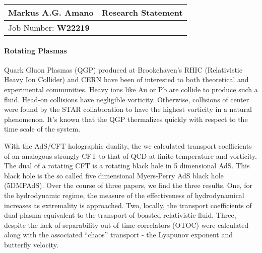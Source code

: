 \documentclass[12pt]{article}
\begin{document}
\begin{center}
  \begin{tabularx}{\textwidth} { 
      >{\raggedright\arraybackslash}X 
    >{\raggedleft\arraybackslash}X  }
    \huge Markus A.G. Amano & Research Statement\\
    \hline
    Job Number: \textbf{W22219} & \\
  \end{tabularx}
\end{center}


\paragraph{Rotating Plasmas}

Quark Gluon Plasmas (QGP) produced at Brookehaven's RHIC (Relativistic Heavy Ion Collider) and CERN have been of interested to both theoretical and experimental communities.
Heavy ions like Au or Pb are collide to produce such a fluid.
Head-on collisions have negligible vorticity.
Otherwise, collisions of center were found by the STAR collaboration to have the highest vorticity in a natural phenomenon.
It's known that the QGP thermalizes quickly with respect to the time scale of the system.

With the AdS/CFT holographic duality, the we calculated transport coefficients of an analogous strongly CFT to that of QCD at finite temperature and vorticity.
The dual of a rotating CFT is a rotating black hole in 5 dimensional AdS. 
This black hole is the so called five dimensional Myers-Perry AdS black hole (5DMPAdS).
Over the course of three papers, we find the three results. 
One, for the hydrodynamic regime, the measure of the effectiveness of hydrodynamical increases as extremality is approached.
Two, locally, the transport coefficients of dual plasma equivalent to the transport of boasted relativistic fluid.
Three, despite the lack of separability out of time correlators (OTOC) were calculated along with the associated ``chaos'' transport - the Lyapunov exponent and butterfly velocity.
\end{document}
